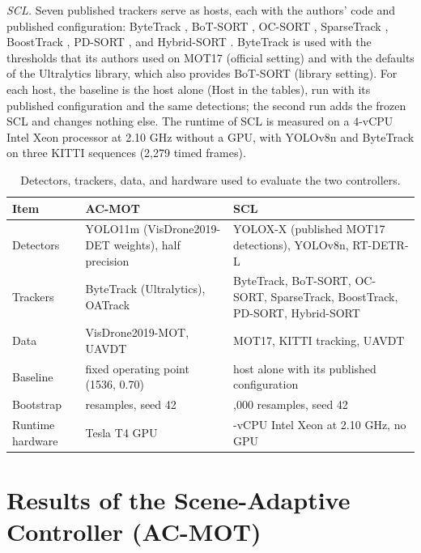 \emph{SCL.} Seven published trackers serve as hosts, each with the authors' code and published configuration: ByteTrack \cite{zhang2022bytetrack}, BoT-SORT \cite{aharon2022botsort}, OC-SORT \cite{cao2023ocsort}, SparseTrack \cite{liu2025sparsetrack}, BoostTrack \cite{stanojevic2024boosttrack}, PD-SORT \cite{wang2025pdsort}, and Hybrid-SORT \cite{yang2024hybridsort}. ByteTrack is used with the thresholds that its authors used on MOT17 (official setting) and with the defaults of the Ultralytics library, which also provides BoT-SORT (library setting). For each host, the baseline is the host alone (Host in the tables), run with its published configuration and the same detections; the second run adds the frozen SCL and changes nothing else. The runtime of SCL is measured on a 4-vCPU Intel Xeon processor at 2.10 GHz without a GPU, with YOLOv8n and ByteTrack on three KITTI sequences (2,279 timed frames).

\begin{table}[tbp]
\centering
\caption{Detectors, trackers, data, and hardware used to evaluate the two controllers.}
\label{tab:res-env}
\begin{tabular}{>{\raggedright\arraybackslash}p{2.8cm}>{\raggedright\arraybackslash}p{5.6cm}>{\raggedright\arraybackslash}p{5.9cm}}
\toprule
Item & AC-MOT & SCL\\
\midrule
Detectors & YOLO11m (VisDrone2019-DET weights), half precision & YOLOX-X (published MOT17 detections), YOLOv8n, RT-DETR-L\\
Trackers & ByteTrack (Ultralytics), OATrack & ByteTrack, BoT-SORT, OC-SORT, SparseTrack, BoostTrack, PD-SORT, Hybrid-SORT\\
Data & VisDrone2019-MOT, UAVDT & MOT17, KITTI tracking, UAVDT\\
Baseline & fixed operating point (1536, 0.70) & host alone with its published configuration\\
Bootstrap & 5000 resamples, seed 42 & 10,000 resamples, seed 42\\
Runtime hardware & Tesla T4 GPU & 4-vCPU Intel Xeon at 2.10 GHz, no GPU\\
\bottomrule
\end{tabular}
\end{table}

\section{Results of the Scene-Adaptive Controller (AC-MOT)}\label{sec:res-acmot}

